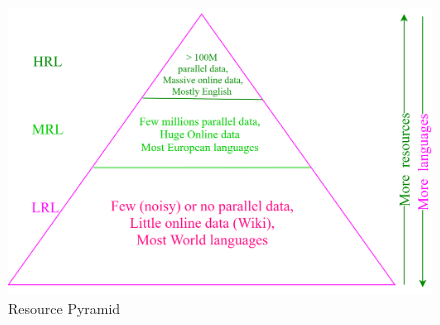 \documentclass[manuscript,screen]{acmart}
\begin{document}
\begin{figure}[!h]
  \centering
  \includegraphics[width=0.7\linewidth]{resourcePyramid.png}
  \caption{Resource Pyramid}
  \label{Resource-Pyramid}
\end{figure}
\end{document}
